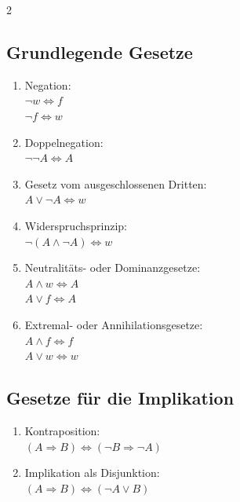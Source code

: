 \documentclass[ngerman,11pt]{article}
\begin{document}
\begin{multicols}{2}

\subsection*{Grundlegende Gesetze}

\begin{enumerate}[label=\arabic*.]

\item Negation:\\
$\neg w \Leftrightarrow f$\\
$\neg f \Leftrightarrow w$

\item Doppelnegation:\\
$\neg\neg A \Leftrightarrow A$

\item Gesetz vom ausgeschlossenen Dritten:\\
$A \vee \neg A \Leftrightarrow w$

\item Widerspruchsprinzip:\\
$\neg(A \wedge \neg A) \Leftrightarrow w$

\item Neutralitäts- oder Dominanzgesetze:\\
$A \wedge w \Leftrightarrow A$\\
$A \vee f \Leftrightarrow A$

\item Extremal- oder Annihilationsgesetze:\\
$A \wedge f \Leftrightarrow f$\\
$A \vee w \Leftrightarrow w$
\end{enumerate}

\subsection*{Gesetze für die Implikation}

\begin{enumerate}[label=\arabic*., start=7]
\item Kontraposition:\\
$(A \Rightarrow B) \Leftrightarrow (\neg B \Rightarrow \neg A)$

\item Implikation als Disjunktion:\\
$(A \Rightarrow B) \Leftrightarrow (\neg A \vee B)$


\end{enumerate}
\end{multicols}
\end{document}
